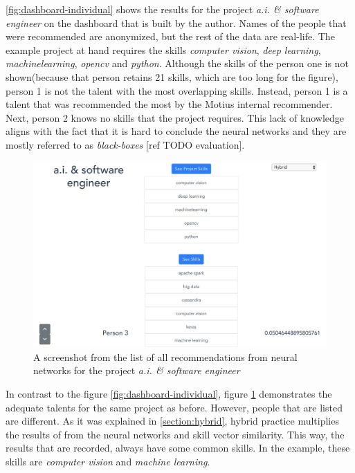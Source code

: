 \autoref{fig:dashboard-individual} shows the results for the project \textit{a.i. \& software engineer} on the dashboard that is built by the author. Names of the people that were recommended are anonymized, but the rest of the data are real-life. The example project at hand requires the skills \textit{computer vision}, \textit{deep learning}, \textit{machinelearning}, \textit{opencv} and \textit{python}. Although the skills of the person one is not shown(because that person retains 21 skills, which are too long for the figure), person 1 is not the talent with the most overlapping skills. Instead, person 1 is a talent that was recommended the most by the Motius internal recommender. Next, person 2 knows no skills that the project requires. This lack of knowledge aligns with the fact that it is hard to conclude the neural networks and they are mostly referred to as \textit{black-boxes} \cite{benitez1997artificial} [ref TODO evaluation].

 \begin{figure}[!ht]
	\centering
	\includegraphics[width=\textwidth]{figures/DashboardIndividualHybrid.png}
	\caption{A screenshot from the list of all recommendations from neural networks for the project \textit{a.i. \& software engineer}}
	\label{fig:dashboard-individual-hybrid}
\end{figure}

In contrast to the figure \ref{fig:dashboard-individual}, figure \ref{fig:dashboard-individual-hybrid} demonstrates the adequate talents for the same project as before. However, people that are listed are different. As it was explained in \ref{section:hybrid}, hybrid practice multiplies the results of from the neural networks and skill vector similarity. This way, the results that are recorded, always have some common skills. In the example, these skills are \textit{computer vision} and \textit{machine learning}.

